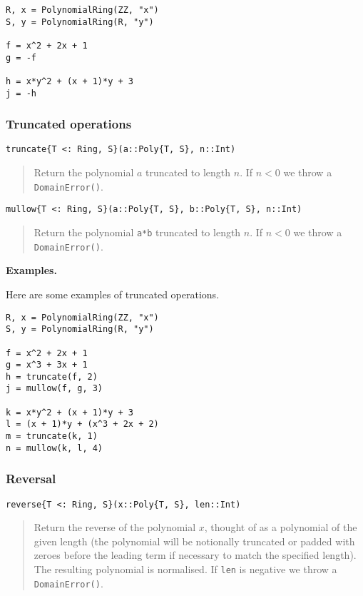 \documentclass[a4paper,10pt]{article}
\newcommand{\code}{\lstinline}
\newcommand{\desc}[1]{\vspace{-3mm}\begin{quote}#1\end{quote}}
\begin{document}
{{{\begin{lstlisting}
R, x = PolynomialRing(ZZ, "x")
S, y = PolynomialRing(R, "y")

f = x^2 + 2x + 1
g = -f

h = x*y^2 + (x + 1)*y + 3
j = -h
\end{lstlisting}

\subsubsection{Truncated operations}

\begin{lstlisting}
truncate{T <: Ring, S}(a::Poly{T, S}, n::Int)
\end{lstlisting}

\desc{Return the polynomial $a$ truncated to length $n$. If $n < 0$ we throw a
\code{DomainError()}.}

\begin{lstlisting}
mullow{T <: Ring, S}(a::Poly{T, S}, b::Poly{T, S}, n::Int)
\end{lstlisting}

\desc{Return the polynomial \code{a*b} truncated to length $n$. If $n < 0$ we
throw a \code{DomainError()}.}

\textbf{Examples.}

Here are some examples of truncated operations.

\begin{lstlisting}
R, x = PolynomialRing(ZZ, "x")
S, y = PolynomialRing(R, "y")

f = x^2 + 2x + 1
g = x^3 + 3x + 1
h = truncate(f, 2)
j = mullow(f, g, 3)

k = x*y^2 + (x + 1)*y + 3
l = (x + 1)*y + (x^3 + 2x + 2)
m = truncate(k, 1)
n = mullow(k, l, 4)
\end{lstlisting}

\subsubsection{Reversal}

\begin{lstlisting}
reverse{T <: Ring, S}(x::Poly{T, S}, len::Int)
\end{lstlisting}

\desc{Return the reverse of the polynomial $x$, thought of as a polynomial of
the given length (the polynomial will be notionally truncated or padded with
zeroes before the leading term if necessary to match the specified length). 
The resulting polynomial is normalised. If \code{len} is negative we throw a
\code{DomainError()}.}

}}}
\end{document}
